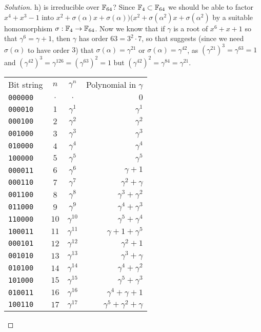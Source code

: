 \begin{proof}[Solution]
h) is irreducible over $\mathbb{F}_{64}$?
Since $\mathbb{F}_4 \subset \mathbb{F}_{64}$ we should be able to factor $x^4 + x^3 - 1$ into $x^2 + \sigma(\alpha) x + \sigma(\alpha))(x^2 + \sigma(\alpha^2) x + \sigma(\alpha^2)$ by a suitable homomorphism $\sigma: \mathbb{F}_{4} \to \mathbb{F}_{64}$. Now we know that if $\gamma$ is a root of $x^{6} + x + 1$ so that $\gamma^{6} = \gamma + 1$, then $\gamma$ has order $63 = 3^2 \cdot 7$, so that suggests (since we need $\sigma(\alpha)$ to have order $3$) that $\sigma(\alpha) = \gamma^{21} $ or $\sigma(\alpha) = \gamma^{42}$, as $(\gamma^{21})^3 = \gamma^{63} = 1$ and $(\gamma^{42})^3 = \gamma^{126} = (\gamma^{63})^2 = 1$ but $(\gamma^{42})^2 = \gamma^{84} = \gamma^{21}$.

\begin{tabular}{l|c|c|r}
Bit string & $n$ & $\gamma^n$ & Polynomial in $\gamma$\\
\texttt{000000} & $ .$ & $.        $ & $0$\\
\texttt{000010} & $ 1$ & $\gamma^{ 1}$ & $\gamma^1$\\ 
\texttt{000100} & $ 2$ & $\gamma^{ 2}$ & $\gamma^2$\\
\texttt{001000} & $ 3$ & $\gamma^{ 3}$ & $\gamma^3$\\
\texttt{010000} & $ 4$ & $\gamma^{ 4}$ & $\gamma^4$\\
\texttt{100000} & $ 5$ & $\gamma^{ 5}$ & $\gamma^5$\\
\texttt{000011} & $ 6$ & $\gamma^{ 6}$ & $\gamma + 1$\\
\texttt{000110} & $ 7$ & $\gamma^{ 7}$ & $\gamma^2 + \gamma$\\
\texttt{001100} & $ 8$ & $\gamma^{ 8}$ & $\gamma^3 + \gamma^2$\\
\texttt{011000} & $ 9$ & $\gamma^{ 9}$ & $\gamma^4 + \gamma^3$\\
%
\texttt{110000} & $10$ & $\gamma^{10}$ & $\gamma^5 + \gamma^4$\\
\texttt{100011} & $11$ & $\gamma^{11}$ & $\gamma + 1 + \gamma^5$\\
\texttt{000101} & $12$ & $\gamma^{12}$ & $\gamma^2 + 1$\\
\texttt{001010} & $13$ & $\gamma^{13}$ & $\gamma^3 + \gamma$\\
\texttt{010100} & $14$ & $\gamma^{14}$ & $\gamma^4 + \gamma^2$\\
\texttt{101000} & $15$ & $\gamma^{15}$ & $\gamma^5 + \gamma^3$\\
\texttt{010011} & $16$ & $\gamma^{16}$ & $\gamma^4 + \gamma + 1$\\
\texttt{100110} & $17$ & $\gamma^{17}$ & $\gamma^5 + \gamma^2 + \gamma$\\

\end{tabular}
\end{proof}

